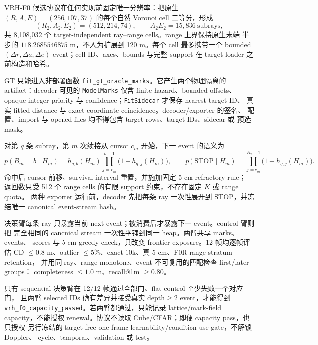 \documentclass[11pt,a4paper,fontset=none]{ctexart}
\newcommand{\code}[1]{\texttt{#1}}
\begin{document}
VRH-F0 候选协议在任何实现前固定唯一分辨率：把原生
$(R,A,E)=(256,107,37)$ 的每个自然 Voronoi cell 二等分，形成
\begin{equation}
  (R_2,A_2,E_2)=(512,214,74),\qquad
  A_2E_2=15{,}836\ \text{subrays},
\end{equation}
共 8,108,032 个 target-independent ray--range cells。range 上界保持原生末端
半步的 $118.2685546875$ m，不人为扩展到 120 m。每个 cell 最多携带一个
bounded $(\Delta r,\Delta a,\Delta e)$ event；cell ID、axes、bounds 与完整 support
在 target loader 之前构造和哈希。

GT 只能进入非部署函数 \code{fit\_gt\_oracle\_marks}。它产生两个物理隔离的
artifact：decoder 可见的 \code{ModelMarks} 仅含 finite hazard、bounded offsets、
opaque integer priority 与 confidence；\code{FitSidecar} 才保存 nearest-target ID、
真实 fitted distance 与 exact-coordinate coincidence。decoder/exporter 的签名、
配置、import 与 opened files 均不得包含 target rows、target IDs、sidecar 或
预选 mask。

对第 $q$ 条 subray，第 $m$ 次续接从 cursor $c_m$ 开始，下一 event 的语义为
\begin{equation}
 p(B_m=b\mid H_m)=h_{q,b}(H_m)
 \prod_{j=c_m}^{b-1}\bigl(1-h_{q,j}(H_m)\bigr),
 \qquad
 p(\mathrm{STOP}\mid H_m)=
 \prod_{j=c_m}^{R_2-1}\bigl(1-h_{q,j}(H_m)\bigr).
\end{equation}
命中后 cursor 前移、survival interval 重置，并施加固定 5 cm refractory rule；
返回数只受 512 个 range cells 的有限 support 约束，不存在固定 $K$ 或 range quota。
两种 exporter 运行前，decoder 先把每条 ray 一次性展开到 STOP，并冻结唯一
canonical event-stream hash。

决策臂每条 ray 只暴露当前 next event；被消费后才暴露下一 event。control 臂则把
完全相同的 canonical stream 一次性平铺到同一 heap。两臂共享 marks、events、
scores 与 5 cm greedy check，只改变 frontier exposure。12 帧均逐帧评估 CD
$\le0.8$ m、outlier $\le5\%$、exact 10k、真 5 cm、F0R range-stratum retention，
并用同 ray、range-monotone、event 不可复用的匹配检查 first/later groups：
completeness $\le1.0$ m、recall@1m $\ge0.80$。

只有 sequential 决策臂在 12/12 帧通过全部门、flat control 至少失败一个对应门，
且两臂 selected IDs 确有差异并接受真实 depth$\ge2$ event，才能得到
\code{vrh\_f0\_capacity\_passed}。若两臂都通过，只能记录 lattice/mark-field
capacity，不能授权 renewal。协议不读取 Cube/CFAR；即便 capacity pass，也只授权
另行冻结的 target-free one-frame learnability/condition-use gate，不解锁 Doppler、
cycle、temporal、validation 或 test。
\end{document}
